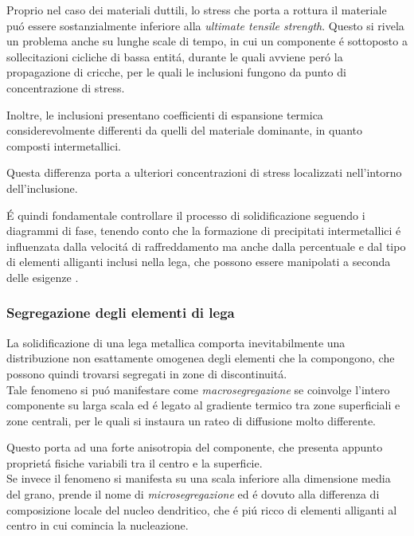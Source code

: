 \documentclass{article}
\begin{document}
            Proprio nel caso dei materiali duttili, lo stress che porta a rottura il materiale puó essere
            sostanzialmente inferiore alla \textit{ultimate tensile strength}. Questo si rivela un problema 
            anche su lunghe scale di tempo, in cui un componente é sottoposto a sollecitazioni cicliche di bassa
            entitá, durante le quali avviene peró la propagazione di cricche, per le quali le inclusioni
            fungono da punto di concentrazione di stress. 

            Inoltre, le inclusioni presentano coefficienti di espansione termica considerevolmente differenti
             da quelli del materiale
            dominante, in quanto composti intermetallici. 

            Questa differenza porta a ulteriori concentrazioni di stress localizzati nell'intorno
            dell'inclusione.

            É quindi fondamentale controllare il processo di solidificazione seguendo i diagrammi di fase, 
            tenendo conto che la formazione di precipitati intermetallici é influenzata dalla velocitá
            di raffreddamento ma anche dalla percentuale e dal tipo di elementi alliganti inclusi nella lega, 
            che possono essere manipolati a seconda delle esigenze \autocite{Mouritz}. 

            \subsubsection{Segregazione degli elementi di lega\label{Casting_difetti_segregazione}}

            La solidificazione di una lega metallica comporta inevitabilmente una distribuzione non esattamente 
            omogenea degli elementi che la compongono, che possono quindi trovarsi segregati in zone di discontinuitá. \\ 

            Tale fenomeno si puó manifestare come \textit{macrosegregazione} se coinvolge l'intero 
            componente su larga scala ed é legato al gradiente termico tra zone superficiali e zone
            centrali, per le quali si instaura un rateo di diffusione molto differente. 

            Questo porta ad una forte anisotropia del componente, che presenta appunto proprietá 
            fisiche variabili tra il centro e la superficie. \\ 

            Se invece il fenomeno si manifesta su una scala inferiore alla dimensione media del grano, 
            prende il nome di \textit{microsegregazione} ed é dovuto alla differenza di composizione locale
            del nucleo dendritico, che é piú ricco di elementi alliganti al centro in cui comincia la nucleazione. \\ 
\end{document}
